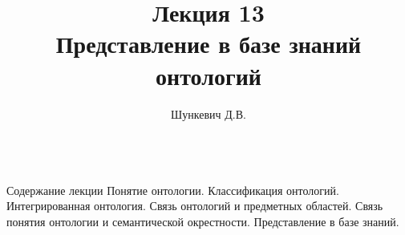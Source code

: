 \title{Лекция 13\\Представление в базе знаний онтологий}
\author[]{Шункевич Д.В.}

\begin{frame}
	\titlepage
\end{frame}

\begin{frame}{\\Содержание лекции}
	\topline
	\justifying
	Понятие онтологии. Классификация онтологий. Интегрированная онтология. Связь онтологий и предметных областей. Связь понятия онтологии и семантической окрестности. Представление в базе знаний.
\end{frame}